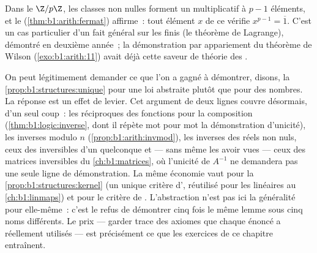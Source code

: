 \begin{remark}
Dans le  $\Z/p\Z$, les classes non nulles forment un 
multiplicatif à $p - 1$ éléments, et le 
(\cref{thm:b1:arith:fermat}) affirme~: tout élément $x$ de ce 
vérifie $x^{p-1} = \overline 1$. C'est un cas particulier d'un fait
général sur les  finis (le théorème de Lagrange), démontré en
deuxième année~; la démonstration par appariement du théorème de
Wilson (\cref{exo:b1:arith:11}) avait déjà cette saveur de théorie des
.
\end{remark}

\begin{remark}\label{rem:b1:structures:interlude}
On peut légitimement demander ce que l'on a gagné à démontrer,
disons, la \cref{prop:b1:structures:unique} pour une loi abstraite
plutôt que pour des nombres. La réponse est un effet de levier. Cet
argument de deux lignes couvre désormais, d'un seul coup~: les
réciproques des fonctions pour la composition
(\cref{thm:b1:logic:inverse}, dont il répète mot pour mot la
démonstration d'unicité), les inverses modulo $n$
(\cref{prop:b1:arith:invmod}), les inverses des réels non nuls, ceux
des inversibles d'un  quelconque et --- sans même les avoir
vues --- ceux des matrices inversibles du \cref{ch:b1:matrices}, où
l'unicité de $A^{-1}$ ne demandera pas une seule ligne de
démonstration. La même économie vaut pour
la \cref{prop:b1:structures:kernel} (un unique critère d',
réutilisé pour les  linéaires au \cref{ch:b1:linmaps}) et
pour le critère de . L'abstraction n'est pas ici la
généralité pour elle-même~: c'est le refus de démontrer cinq fois le
même lemme sous cinq noms différents. Le prix --- garder trace des
axiomes que chaque énoncé a réellement utilisés --- est précisément
ce que les exercices de ce chapitre entraînent.
\end{remark}

